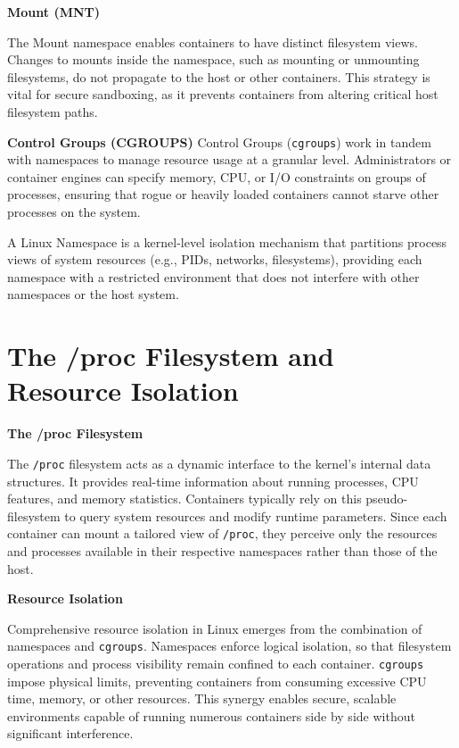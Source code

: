 \textbf{Mount (MNT)}

The Mount namespace enables containers to have distinct filesystem views. Changes to mounts inside the namespace, such as mounting or unmounting filesystems, do not propagate to the host or other containers. This strategy is vital for secure sandboxing, as it prevents containers from altering critical host filesystem paths.

\textbf{Control Groups (CGROUPS)}
Control Groups (\texttt{cgroups}) work in tandem with namespaces to manage resource usage at a granular level. Administrators or container engines can specify memory, CPU, or I/O constraints on groups of processes, ensuring that rogue or heavily loaded containers cannot starve other processes on the system.

\begin{definitionblock}
A Linux Namespace is a kernel-level isolation mechanism that partitions process views of system resources (e.g., PIDs, networks, filesystems), providing each namespace with a restricted environment that does not interfere with other namespaces or the host system.
\end{definitionblock}

\section{The /proc Filesystem and Resource Isolation}

\textbf{The /proc Filesystem}

The \texttt{/proc} filesystem acts as a dynamic interface to the kernel’s internal data structures. It provides real-time information about running processes, CPU features, and memory statistics. Containers typically rely on this pseudo-filesystem to query system resources and modify runtime parameters. Since each container can mount a tailored view of \texttt{/proc}, they perceive only the resources and processes available in their respective namespaces rather than those of the host.

\textbf{Resource Isolation}

Comprehensive resource isolation in Linux emerges from the combination of namespaces and \texttt{cgroups}. Namespaces enforce logical isolation, so that filesystem operations and process visibility remain confined to each container. \texttt{cgroups} impose physical limits, preventing containers from consuming excessive CPU time, memory, or other resources. This synergy enables secure, scalable environments capable of running numerous containers side by side without significant interference.

